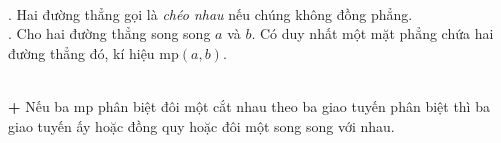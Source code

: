 \documentclass[12pt]{article}
\begin{document}
\begin{notebox}
\noindent\textbf{}\\
. Hai đường thẳng gọi là \textit{chéo nhau} nếu chúng không đồng phẳng.\\
. Cho hai đường thẳng song song $a$ và $b$. Có duy nhất một mặt phẳng chứa hai đường thẳng đó, kí hiệu $\text{mp}(a, b)$.
\end{notebox}

\vspace{0.2cm}

\noindent\textbf{\color{myblue}{b/ Tính chất cơ bản về hai đường thẳng song song.}}\\
\textbf{+} Nếu ba mp phân biệt đôi một cắt nhau theo ba giao tuyến phân biệt thì ba giao tuyến ấy hoặc đồng quy hoặc đôi một song song với nhau.

\vspace{0.4cm}
\end{document}
